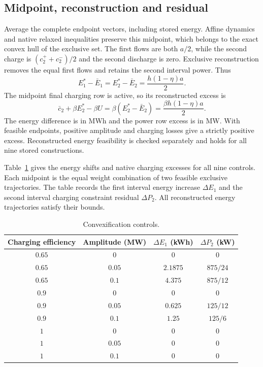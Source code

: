 \subsection{Midpoint, reconstruction and residual}
Average the complete endpoint vectors, including stored energy.
Affine dynamics and native relaxed inequalities preserve this midpoint,
which belongs to the exact convex hull of the exclusive set. The first
flows are both $a/2$, while the second charge is
$(c_2^++c_2^-)/2$ and the second discharge is zero.
Exclusive reconstruction removes the equal first flows and retains the
second interval power. Thus
\begin{equation}
E_1^*-\bar E_1=E_2^*-\bar E_2
=\frac{h(1-\eta)a}{2}.\label{eq:hull_energy_shift}
\end{equation}
The midpoint final charging row is active, so its reconstructed excess is
\begin{equation}
\bar c_2+\beta E_2^*-\beta U
=\beta(E_2^*-\bar E_2)
=\frac{\beta h(1-\eta)a}{2}.\label{eq:hull_power_shift}
\end{equation}
The energy difference is in MWh and the power row excess is in MW.
With feasible endpoints, positive amplitude and charging losses give a
strictly positive excess. Reconstructed energy feasibility is checked
separately and holds for all nine stored constructions.

Table~\ref{tab:residual_controls} gives the energy shifts and native charging excesses for all nine controls.
Each midpoint is the equal weight combination of two feasible exclusive
trajectories. The table records the first interval energy increase
$\Delta E_1$ and the second interval charging constraint residual $\Delta P_2$.
All reconstructed energy trajectories satisfy their bounds.

\begin{table}[htbp]
\caption{Convexification controls.}\label{tab:residual_controls}

\begin{tabular}{@{}c c c c@{}}
\toprule
Charging efficiency & Amplitude (MW) & $\Delta E_1$ (kWh) & $\Delta P_2$ (kW)\\
\midrule
$0.65$ & $0$ & $0$ & $0$ \\
$0.65$ & $0.05$ & $2.1875$ & $875/24$ \\
$0.65$ & $0.1$ & $4.375$ & $875/12$ \\
$0.9$ & $0$ & $0$ & $0$ \\
$0.9$ & $0.05$ & $0.625$ & $125/12$ \\
$0.9$ & $0.1$ & $1.25$ & $125/6$ \\
$1$ & $0$ & $0$ & $0$ \\
$1$ & $0.05$ & $0$ & $0$ \\
$1$ & $0.1$ & $0$ & $0$ \\
\bottomrule
\end{tabular}
\end{table}

